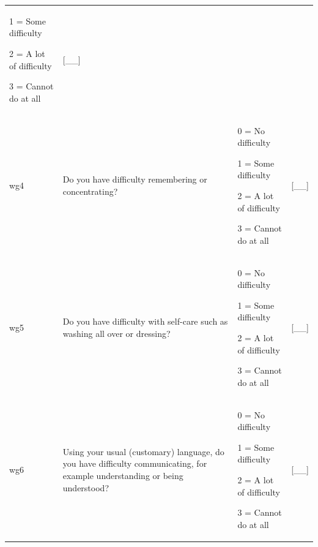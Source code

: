 \documentclass[12pt,a4paper]{book}
\theoremstyle{definition}
\theoremstyle{definition}
\theoremstyle{definition}
\theoremstyle{remark}
\begin{document}
\begin{longtable}[]{@{}llll@{}}
\begin{minipage}[t]{0.24\columnwidth}
1 = Some difficulty

2 = A lot of difficulty

3 = Cannot do at all\strut
\end{minipage} & \begin{minipage}[t]{0.24\columnwidth}\raggedright
{[}\_\_{]}\strut
\end{minipage}\tabularnewline
\begin{minipage}[t]{0.24\columnwidth}\raggedright
wg4\strut
\end{minipage} & \begin{minipage}[t]{0.24\columnwidth}\raggedright
Do you have difficulty remembering or concentrating?\strut
\end{minipage} & \begin{minipage}[t]{0.24\columnwidth}\raggedright
0 = No difficulty

1 = Some difficulty

2 = A lot of difficulty

3 = Cannot do at all\strut
\end{minipage} & \begin{minipage}[t]{0.24\columnwidth}\raggedright
{[}\_\_{]}\strut
\end{minipage}\tabularnewline
\begin{minipage}[t]{0.24\columnwidth}\raggedright
wg5\strut
\end{minipage} & \begin{minipage}[t]{0.24\columnwidth}\raggedright
Do you have difficulty with self-care such as washing all over or
dressing?\strut
\end{minipage} & \begin{minipage}[t]{0.24\columnwidth}\raggedright
0 = No difficulty

1 = Some difficulty

2 = A lot of difficulty

3 = Cannot do at all\strut
\end{minipage} & \begin{minipage}[t]{0.24\columnwidth}\raggedright
{[}\_\_{]}\strut
\end{minipage}\tabularnewline
\begin{minipage}[t]{0.24\columnwidth}\raggedright
wg6\strut
\end{minipage} & \begin{minipage}[t]{0.24\columnwidth}\raggedright
Using your usual (customary) language, do you have difficulty
communicating, for example understanding or being understood?\strut
\end{minipage} & \begin{minipage}[t]{0.24\columnwidth}\raggedright
0 = No difficulty

1 = Some difficulty

2 = A lot of difficulty

3 = Cannot do at all\strut
\end{minipage} & \begin{minipage}[t]{0.24\columnwidth}\raggedright
{[}\_\_{]}\strut
\end{minipage}\tabularnewline
\bottomrule
\end{longtable}
\end{document}
